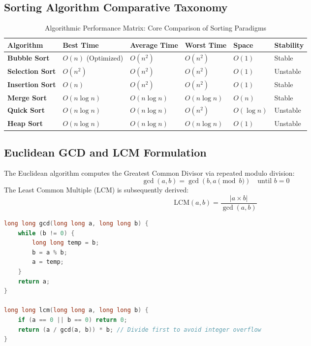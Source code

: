 \subsection{Sorting Algorithm Comparative Taxonomy}
\begin{table}[htbp]
\centering
\small
\begin{tabularx}{\textwidth}{l l l l l l}
\toprule
\textbf{Algorithm} & \textbf{Best Time} & \textbf{Average Time} & \textbf{Worst Time} & \textbf{Space} & \textbf{Stability} \\
\midrule
\textbf{Bubble Sort} & $O(n)$ (Optimized) & $O(n^2)$ & $O(n^2)$ & $O(1)$ & Stable \\
\textbf{Selection Sort} & $O(n^2)$ & $O(n^2)$ & $O(n^2)$ & $O(1)$ & Unstable \\
\textbf{Insertion Sort} & $O(n)$ & $O(n^2)$ & $O(n^2)$ & $O(1)$ & Stable \\
\textbf{Merge Sort} & $O(n \log n)$ & $O(n \log n)$ & $O(n \log n)$ & $O(n)$ & Stable \\
\textbf{Quick Sort} & $O(n \log n)$ & $O(n \log n)$ & $O(n^2)$ & $O(\log n)$ & Unstable \\
\textbf{Heap Sort} & $O(n \log n)$ & $O(n \log n)$ & $O(n \log n)$ & $O(1)$ & Unstable \\
\bottomrule
\end{tabularx}
\caption{Algorithmic Performance Matrix: Core Comparison of Sorting Paradigms}
\label{tab:sorting_comparison}
\end{table}

\subsection{Euclidean GCD and LCM Formulation}
The Euclidean algorithm computes the Greatest Common Divisor via repeated modulo division:
\[
\gcd(a, b) = \gcd(b, a \pmod b) \quad \text{until } b = 0
\]
The Least Common Multiple (LCM) is subsequently derived:
\[
\text{LCM}(a, b) = \frac{|a \times b|}{\gcd(a, b)}
\]

\begin{lstlisting}[language=C]
long long gcd(long long a, long long b) {
    while (b != 0) {
        long long temp = b;
        b = a % b;
        a = temp;
    }
    return a;
}

long long lcm(long long a, long long b) {
    if (a == 0 || b == 0) return 0;
    return (a / gcd(a, b)) * b; // Divide first to avoid integer overflow
}
\end{lstlisting}

